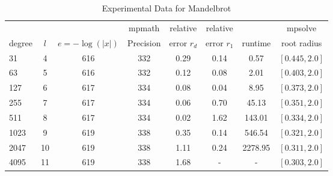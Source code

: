 \documentclass[sigconf]{acmart}
\begin{document}
\begin{table}[t]
\caption{Experimental Data for Mandelbrot}
\label{tab:mand}
\vskip -0.15in
\begin{center}
\begin{small}
\begin{sc}
\begin{tabular}{lccccccc}
\toprule
&  &  & mpmath & relative  & relative &  & mpsolve \\
degree  & $l$& $e=-\log(|x|)$& Precision &error $r_d$       & error $r_1$ &runtime& root radius\\
\midrule
     31 & 4 & 616 & 332 & 0.29 & 0.14 & 0.57 & $[0.445, 2.0]$\\
     63 & 5 & 616 & 332 & 0.12 & 0.08 & 2.01 & $[0.403, 2.0]$\\
   127 & 6 & 617 & 334 & 0.08 & 0.04 & 8.95 & $[0.373,2.0]$ \\
   255 & 7 & 617 & 334 & 0.06 & 0.70 & 45.13 & $[0.351, 2.0]$\\
   511 & 8 & 617 & 334 & 0.02 & 1.62 & 143.01 & $[0.334, 2.0]$\\
 1023 & 9 & 619 & 338 & 0.35 & 0.14 & 546.54 & $[0.321,2.0]$\\
 2047 &10& 619 & 338 & 1.11 & 0.24 & 2278.95 & $[0.311,2.0]$\\
 4095 & 11 & 619 & 338 & 1.68 & - & - & $[0.303,2.0]$\\

\bottomrule
\end{tabular}
\end{sc}
\end{small}
\end{center}
\vskip 0.05in
\end{table}
\end{document}
